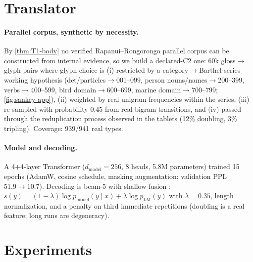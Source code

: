 \documentclass[10pt,twocolumn]{article}
\newcommand{\Ctwo}{\textsf{C2}}
\begin{document}
\section{Translator}
\label{sec:translator}

\paragraph{Parallel corpus, synthetic by necessity.} By
\cref{thm:T1-body} no verified Rapanui--Rongorongo parallel corpus can
be constructed from internal evidence, so we build a declared-\Ctwo{}
one: 60k gloss$\to$glyph pairs where glyph choice is (i) restricted by
a category$\to$Barthel-series working hypothesis
(det/particles$\to$001--099, person nouns/names$\to$200--399,
verbs$\to$400--599, bird domain$\to$600--699, marine
domain$\to$700--799; \cref{fig:sankey-app}), (ii) weighted by real
unigram frequencies within the series, (iii) re-sampled with
probability $0.45$ from real bigram transitions, and (iv) passed
through the reduplication process observed in the tablets (12\%
doubling, 3\% tripling). Coverage: 939/941 real types.

\paragraph{Model and decoding.} A 4+4-layer Transformer
($d_{\mathrm{model}}{=}256$, 8 heads, 5.8M parameters) trained 15
epochs (AdamW, cosine schedule, masking augmentation; validation PPL
$51.9\to10.7$). Decoding is beam-5 with shallow fusion
\cite{gulcehre2015}: $s(y)=(1-\lambda)\log p_{\mathrm{model}}(y\mid
x)+\lambda\log p_{\mathrm{LM}}(y)$ with $\lambda=0.35$, length
normalization, and a penalty on third immediate repetitions
(doubling is a real feature; long runs are degeneracy).

\section{Experiments}
\label{sec:experiments}
\end{document}
